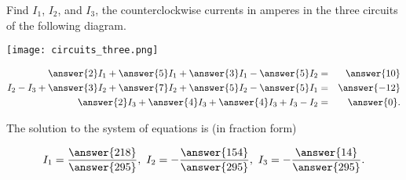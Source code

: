 \documentclass{ximera}
\author{Zack Reed}
\begin{document}
\begin{exercise}

    Find $I_1$, $I_2$, and $I_3$, the counterclockwise currents in
    amperes in the three circuits of the following diagram.
  
    \begin{center}
      \texttt{[image: circuits\_three.png]}
    \end{center}
  
  
      \begin{eqnarray*}
        \answer{2}I_1 + \answer{5}I_1 + \answer{3}I_1 - \answer{5}I_2 &=& \answer{10} \\
        I_2 - I_3 + \answer{3}I_2 + \answer{7}I_2 + \answer{5}I_2 - \answer{5}I_1 &=& \answer{-12} \\
        \answer{2}I_3 + \answer{4}I_3 + \answer{4}I_3 + I_3 - I_2 &=& \answer{0}.
      \end{eqnarray*}

        The solution to the system of equations is (in fraction form)
  
      \begin{equation*}
        I_1 = \frac{\answer{218}}{\answer{295}},\quad
        I_2 = -\frac{\answer{154}}{\answer{295}},\quad
        I_3 = -\frac{\answer{14}}{\answer{295}}.
      \end{equation*}
  

\end{exercise}
\end{document}
